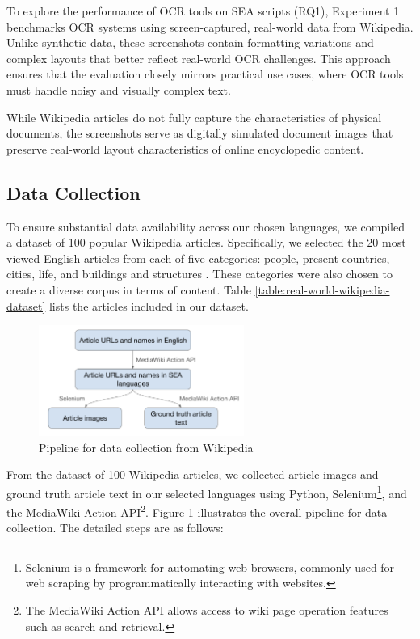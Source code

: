 \documentclass[12pt,oneside]{memoir}
\begin{document}
To explore the performance of OCR tools on SEA scripts (RQ1), Experiment 1 benchmarks OCR systems using screen-captured, real-world data from Wikipedia.
Unlike synthetic data, these screenshots contain formatting variations and complex layouts that better reflect real-world OCR challenges. 
This approach ensures that the evaluation closely mirrors practical use cases, where OCR tools must handle noisy and visually complex text.

While Wikipedia articles do not fully capture the characteristics of physical documents, the screenshots serve as digitally simulated document images that preserve real-world layout characteristics of online encyclopedic content.


\subsection{Data Collection}

To ensure substantial data availability across our chosen languages, we compiled a dataset of 100 popular Wikipedia articles. Specifically, we selected the 20 most viewed English articles from each of five categories: people, present countries, cities, life, and buildings and structures \parencite{wikipedia-popular-pages-2024}.
These categories were also chosen to create a diverse corpus in terms of content. 
Table \ref{table:real-world-wikipedia-dataset} lists the articles included in our dataset.

\begin{figure}[ht]
    \centering
    \includegraphics[width=0.6\textwidth]{images/data-collection.png}
    \caption{Pipeline for data collection from Wikipedia}
    \label{figure:data-collection}
\end{figure}

From the dataset of 100 Wikipedia articles, we collected article images and ground 
truth article text in our selected languages using Python, 
Selenium\footnote{\href{https://selenium-python.readthedocs.io}{Selenium} is a 
framework for automating web browsers, commonly used for web scraping by programmatically 
interacting with websites.}, and the MediaWiki Action API\footnote{The \href{https://www.mediawiki.org/wiki/API:Main_page}{MediaWiki Action API} allows 
access to wiki page operation features such as search and retrieval.}. Figure \ref{figure:data-collection} illustrates the overall pipeline 
for data collection. The detailed steps are as follows:
\end{document}
